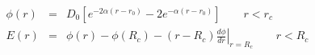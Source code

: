 \documentclass[12pt]{article}
\begin{document}
\begin{eqnarray*}
\phi\left(r\right) & = &  D_0 \left[ e^{- 2 \alpha (r - r_0)} - 2 e^{- \alpha (r - r_0)} \right] \qquad r < r_c \\
E\left(r\right) & = & \phi\left(r\right)  - \phi\left(R_c\right) - \left(r - R_c\right) \left.\frac{d\phi}{d r} \right|_{r=R_c}       \qquad r < R_c 
\end{eqnarray*}                           
\end{document}
